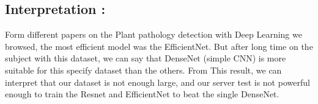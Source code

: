 \documentclass[a4paper]{article}
\begin{document}
  
  
\subsection{Interpretation : }

Form different papers on the Plant pathology detection with Deep Learning we browsed, the most efficient model was the EfficientNet. But after long time on the subject with this dataset, we can say that DenseNet (simple CNN) is more suitable for this specify dataset than the others. 
From This result, we can interpret that our dataset is not enough large, and our server test is not powerful enough to train the Resnet and EfficientNet to beat the single DenseNet. 

\newpage
\listoffigures
\newpage


\end{document}
